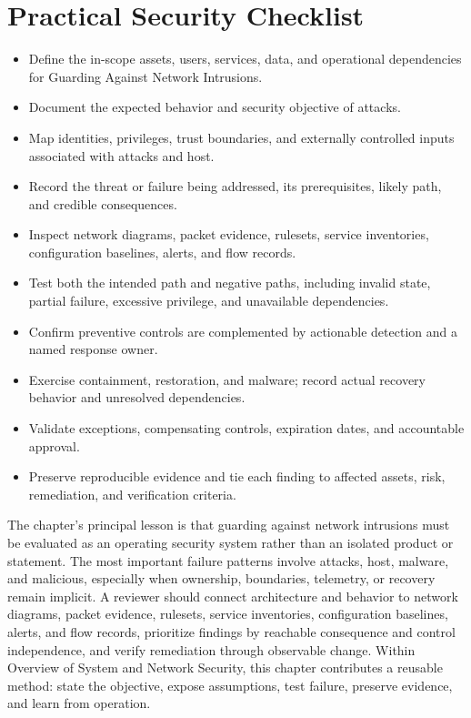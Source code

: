 \documentclass[11pt]{article}
\begin{document}
\section*{Practical Security Checklist}
\begin{itemize}[label=$\square$]
\item Define the in-scope assets, users, services, data, and operational dependencies for Guarding Against Network Intrusions.
\item Document the expected behavior and security objective of attacks.
\item Map identities, privileges, trust boundaries, and externally controlled inputs associated with attacks and host.
\item Record the threat or failure being addressed, its prerequisites, likely path, and credible consequences.
\item Inspect network diagrams, packet evidence, rulesets, service inventories, configuration baselines, alerts, and flow records.
\item Test both the intended path and negative paths, including invalid state, partial failure, excessive privilege, and unavailable dependencies.
\item Confirm preventive controls are complemented by actionable detection and a named response owner.
\item Exercise containment, restoration, and malware; record actual recovery behavior and unresolved dependencies.
\item Validate exceptions, compensating controls, expiration dates, and accountable approval.
\item Preserve reproducible evidence and tie each finding to affected assets, risk, remediation, and verification criteria.
\end{itemize}
\begin{synthesisbox}
The chapter's principal lesson is that guarding against network intrusions must be evaluated as an operating security system rather than an isolated product or statement. The most important failure patterns involve attacks, host, malware, and malicious, especially when ownership, boundaries, telemetry, or recovery remain implicit. A reviewer should connect architecture and behavior to network diagrams, packet evidence, rulesets, service inventories, configuration baselines, alerts, and flow records, prioritize findings by reachable consequence and control independence, and verify remediation through observable change. Within Overview of System and Network Security, this chapter contributes a reusable method: state the objective, expose assumptions, test failure, preserve evidence, and learn from operation.
\end{synthesisbox}
\end{document}
